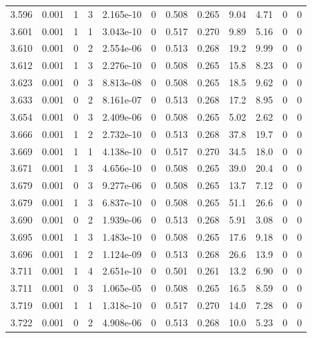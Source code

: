 \documentclass[preview]{standalone}
\begin{document}
{{{{{{{{{\begin{tabular}{L{1.2cm}C{1.2cm} C{0.3cm}C{0.5cm} C{1.4cm}C{1.4cm} C{1.4cm}C{1.4cm} C{1.6cm}C{1.6cm} C{1.6cm}C{1.6cm}}
  3.596  &  0.001  & 1     &  3 &  2.165e-10  & 0  &  0.508&   0.265& 9.04 & 4.71   &  0 & 0  \\ 
  3.601  &  0.001  & 1     &  1 &  3.043e-10  & 0  &  0.517&   0.270& 9.89 & 5.16   &  0 & 0  \\ 
  3.610  &  0.001  & 0     &  2 &  2.554e-06  & 0  &  0.513&   0.268& 19.2 & 9.99   &  0 & 0  \\ 
  3.612  &  0.001  & 1     &  3 &  2.276e-10  & 0  &  0.508&   0.265& 15.8 & 8.23   &  0 & 0  \\ 
  3.623  &  0.001  & 0     &  3 &  8.813e-08  & 0  &  0.508&   0.265& 18.5 & 9.62   &  0 & 0  \\ 
  3.633  &  0.001  & 0     &  2 &  8.161e-07  & 0  &  0.513&   0.268& 17.2 & 8.95   &  0 & 0  \\ 
  3.654  &  0.001  & 0     &  3 &  2.409e-06  & 0  &  0.508&   0.265& 5.02 & 2.62   &  0 & 0  \\ 
  3.666  &  0.001  & 1     &  2 &  2.732e-10  & 0  &  0.513&   0.268& 37.8 & 19.7   &  0 & 0  \\ 
  3.669  &  0.001  & 1     &  1 &  4.138e-10  & 0  &  0.517&   0.270& 34.5 & 18.0   &  0 & 0  \\ 
  3.671  &  0.001  & 1     &  3 &  4.656e-10  & 0  &  0.508&   0.265& 39.0 & 20.4   &  0 & 0  \\ 
  3.679  &  0.001  & 0     &  3 &  9.277e-06  & 0  &  0.508&   0.265& 13.7 & 7.12   &  0 & 0  \\ 
  3.679  &  0.001  & 1     &  3 &  6.837e-10  & 0  &  0.508&   0.265& 51.1 & 26.6   &  0 & 0  \\ 
  3.690  &  0.001  & 0     &  2 &  1.939e-06  & 0  &  0.513&   0.268& 5.91 & 3.08   &  0 & 0  \\ 
  3.695  &  0.001  & 1     &  3 &  1.483e-10  & 0  &  0.508&   0.265& 17.6 & 9.18   &  0 & 0  \\ 
  3.696  &  0.001  & 1     &  2 &  1.124e-09  & 0  &  0.513&   0.268& 26.6 & 13.9   &  0 & 0  \\ 
  3.711  &  0.001  & 1     &  4 &  2.651e-10  & 0  &  0.501&   0.261& 13.2 & 6.90   &  0 & 0  \\ 
  3.711  &  0.001  & 0     &  3 &  1.065e-05  & 0  &  0.508&   0.265& 16.5 & 8.59   &  0 & 0  \\ 
  3.719  &  0.001  & 1     &  1 &  1.318e-10  & 0  &  0.517&   0.270& 14.0 & 7.28   &  0 & 0  \\ 
  3.722  &  0.001  & 0     &  2 &  4.908e-06  & 0  &  0.513&   0.268& 10.0 & 5.23   &  0 & 0  \\ 

\end{tabular}}}}}}}}}}
\end{document}
